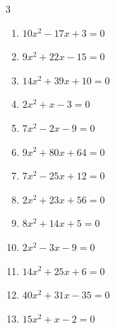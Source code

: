 \begin{multicols}{3}
\begin{enumerate}
  \item $10x^{2}-17x+3=0$


  \item $9x^{2}+22x-15=0$


\columnbreak %

  \item $14x^{2}+39x+10=0$


  \item $2x^{2}+x-3=0$


  \item $7x^{2}-2x-9=0$


  \item $9x^{2}+80x+64=0$


  \item $7x^{2}-25x+12=0$


  \item $2x^{2}+23x+56=0$


  \item $8x^{2}+14x+5=0$


  \item $2x^{2}-3x-9=0$


  \item $14x^{2}+25x+6=0$


  \item $40x^{2}+31x-35=0$


\columnbreak %

  \item $15x^{2}+x-2=0$


\end{enumerate}
\end{multicols}

